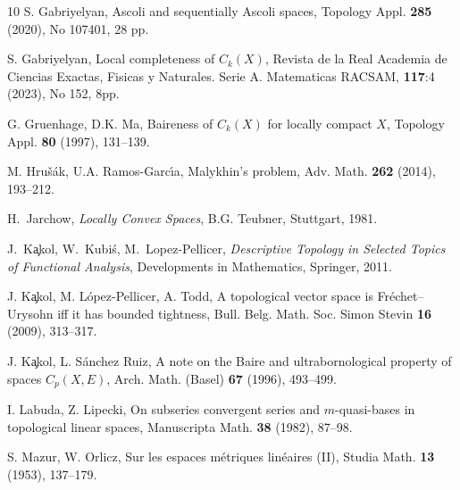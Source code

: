 \documentclass[preprint,11pt]{elsarticle}
\theoremstyle{definition}
\theoremstyle{remark}
\numberwithin{equation}{section}
\numberwithin{theorem}{section}
\newcommand{\CC}{C_k}
\begin{document}
\begin{thebibliography}{10}
S. Gabriyelyan, Ascoli and sequentially Ascoli spaces, Topology Appl. \textbf{285} (2020), No 107401, 28 pp.

S. Gabriyelyan, Local completeness of $\CC(X)$, Revista de la Real Academia de Ciencias Exactas, Fisicas y Naturales. Serie A. Matematicas RACSAM, \textbf{117}:4 (2023), No 152, 8pp.




G. Gruenhage, D.K. Ma, Baireness of $C_k(X)$ for locally compact $X$, Topology Appl. \textbf{80} (1997), 131--139.

M. Hru\v{s}\'{a}k,  U.A. Ramos-Garc\'{\i}a, Malykhin's problem,  Adv. Math. \textbf{262} (2014), 193--212.

H.~Jarchow, \emph{Locally Convex Spaces}, B.G. Teubner, Stuttgart, 1981.

J.~K\c{a}kol, W.~Kubi\'s, M.~Lopez-Pellicer, \emph{Descriptive Topology in Selected  Topics of Functional Analysis}, Developments in Mathematics, Springer, 2011.

J. K\c{a}kol, M. L\'{o}pez-Pellicer, A. Todd, A topological vector space is Fr\'{e}chet--Urysohn iff it has bounded tightness, Bull. Belg. Math. Soc. Simon Stevin \textbf{16} (2009), 313--317.

J. K\c{a}kol, L. S\'{a}nchez Ruiz, A note on the Baire and ultrabornological property of spaces $C_p(X,E)$, Arch. Math. (Basel) \textbf{67} (1996), 493--499.


I. Labuda, Z. Lipecki, On subseries convergent series  and $m$-quasi-bases in topological linear spaces, Manuscripta Math. \textbf{38} (1982), 87--98.



S. Mazur, W. Orlicz, Sur les espaces m\'{e}triques lin\'{e}aires (II), Studia Math. \textbf{13} (1953), 137--179.


\end{thebibliography}
\end{document}
